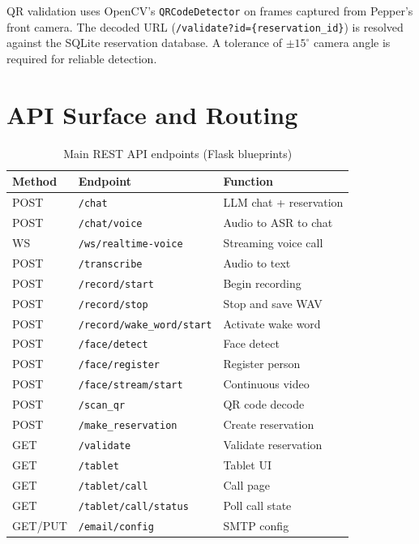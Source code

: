 \documentclass[a4paper]{article}
\begin{document}
QR validation uses OpenCV's \texttt{QRCodeDetector} on frames captured from Pepper's front camera. The decoded URL (\texttt{/validate?id=\{reservation\_id\}}) is resolved against the SQLite reservation database. A tolerance of $\pm 15^{\circ}$ camera angle is required for reliable detection.

\section{API Surface and Routing}

\begin{table}[th]
  \caption{Main REST API endpoints (Flask blueprints)}
  \label{tab:api}
  \centering
  \scriptsize
  \begin{tabular}{lp{34mm}p{20mm}}
    \toprule
    \textbf{Method} & \textbf{Endpoint} & \textbf{Function} \\
    \midrule
    POST    & \texttt{/chat}                    & LLM chat + reservation \\
    POST    & \texttt{/chat/voice}              & Audio to ASR to chat \\
    WS      & \texttt{/ws/realtime-voice}       & Streaming voice call \\
    POST    & \texttt{/transcribe}              & Audio to text \\
    POST    & \texttt{/record/start}            & Begin recording \\
    POST    & \texttt{/record/stop}             & Stop and save WAV \\
    POST    & \texttt{/record/wake\_word/start} & Activate wake word \\
    POST    & \texttt{/face/detect}             & Face detect \\
    POST    & \texttt{/face/register}           & Register person \\
    POST    & \texttt{/face/stream/start}       & Continuous video \\
    POST    & \texttt{/scan\_qr}                & QR code decode \\
    POST    & \texttt{/make\_reservation}       & Create reservation \\
    GET     & \texttt{/validate}                & Validate reservation \\
    GET     & \texttt{/tablet}                  & Tablet UI \\
    GET     & \texttt{/tablet/call}             & Call page \\
    GET     & \texttt{/tablet/call/status}      & Poll call state \\
    GET/PUT & \texttt{/email/config}            & SMTP config \\
    \bottomrule
  \end{tabular}
\end{table}
\end{document}

